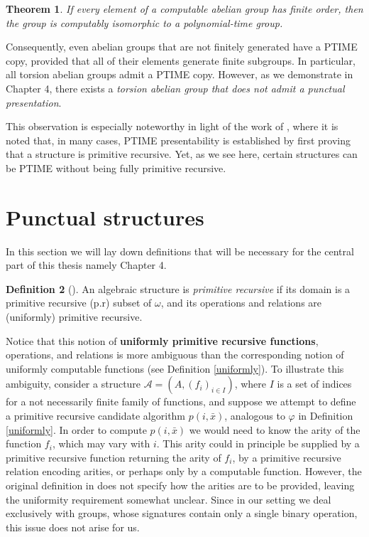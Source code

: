 \documentclass{pracalicmgr2025}
\theoremstyle{plain}            %
\newtheorem{theorem}{Theorem}[chapter]
\theoremstyle{remark}           %
\theoremstyle{definition}       %
\newtheorem{definition}[theorem]{Definition}
\begin{document}
\begin{theorem}
    If every element of a computable abelian group has finite order, then the group is computably isomorphic to a polynomial-time group. 
\end{theorem}

Consequently, even abelian groups that are not finitely generated have a PTIME copy, provided that all of their elements generate finite subgroups. In particular, all torsion abelian groups admit a PTIME copy. However, as we demonstrate in Chapter 4, there exists a \emph{torsion abelian group that does not admit a punctual presentation}. 

This observation is especially noteworthy in light of the work of \cite{3}, where it is noted that, in many cases, PTIME presentability is established by first proving that a structure is primitive recursive. Yet, as we see here, certain structures can be PTIME without being fully primitive recursive.







\section{Punctual structures}\label{3.4}
In this section we will lay down definitions that will be necessary for the central part of this thesis namely Chapter 4.  


\begin{definition}[\cite{3}]\label{p.r struc}
    An algebraic structure is \emph{primitive recursive} if its domain is a primitive recursive (p.r) subset of $\omega$, and its operations and relations are (uniformly) primitive recursive.
\end{definition}

Notice that this notion of \textbf{uniformly primitive recursive functions}, operations, and relations is more ambiguous than the corresponding notion of uniformly computable functions (see Definition \ref{uniformly}). To illustrate this ambiguity, consider a structure $\mathcal{A} = (A, (f_i)_{i \in I})$, where $I$ is a set of indices for a not necessarily finite family of functions, and suppose we attempt to define a primitive recursive candidate algorithm $p(i,\bar{x})$, analogous to $\varphi$ in Definition \ref{uniformly}. In order to compute $p(i,\bar{x})$ we would need to know the arity of the function $f_i$, which may vary with $i$. This arity could in principle be supplied by a primitive recursive function returning the arity of $f_i$, by a primitive recursive relation encoding arities, or perhaps only by a computable function. However, the original definition in \cite{3} does not specify how the arities are to be provided, leaving the uniformity requirement somewhat unclear. Since in our setting we deal exclusively with groups, whose signatures contain only a single binary operation, this issue does not arise for us.
\end{document}
